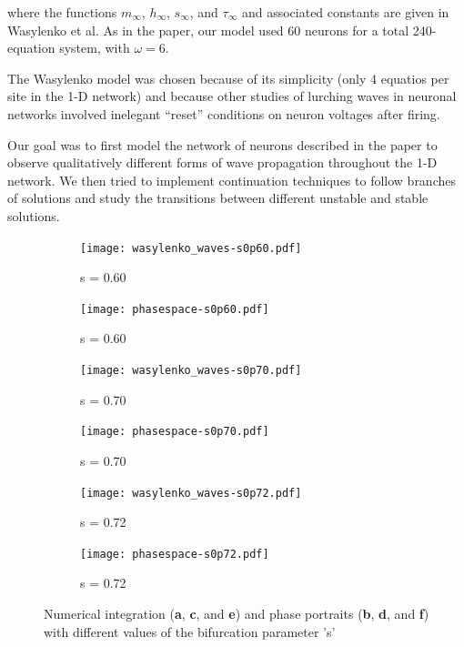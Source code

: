 \documentclass[12pt,letterpaper,oneside,openany]{article}
\begin{document}
where the functions $m_{\infty}$, $h_{\infty}$, $s_{\infty}$, and $\tau_{\infty}$ and associated constants are given in Wasylenko et al. As in the paper, our model used 60 neurons for a total 240-equation system, with $\omega=6$.\cite{Wasylenko2010}

The Wasylenko model was chosen because of its simplicity (only 4 equatios per site in the 1-D network) and because other studies of lurching waves in neuronal networks involved inelegant ``reset'' conditions on neuron voltages after firing.\cite{Golomb1999}

Our goal was to first model the network of neurons described in the paper to observe qualitatively different forms of wave propagation throughout the 1-D network. We then tried to implement continuation techniques to follow branches of solutions and study the transitions between different unstable and stable solutions.

\begin{figure}[t]
  \centering
  \begin{subfigure}[b]{0.5\textwidth}
                \centering
                \texttt{[image: wasylenko\_waves-s0p60.pdf]}
                \caption{s = 0.60}
                \label{fig:waves60}
        \end{subfigure}
        \begin{subfigure}[b]{0.4\textwidth}
                \centering
                \texttt{[image: phasespace-s0p60.pdf]}
                \caption{s = 0.60}
                \label{fig:phase60}
        \end{subfigure}

        \begin{subfigure}[b]{0.5\textwidth}
                \centering
                \texttt{[image: wasylenko\_waves-s0p70.pdf]}
                \caption{s = 0.70}
                \label{fig:waves70}
        \end{subfigure}
        \begin{subfigure}[b]{0.4\textwidth}
                \centering
                \texttt{[image: phasespace-s0p70.pdf]}
                \caption{s = 0.70}
                \label{fig:phase70}
        \end{subfigure}

        \begin{subfigure}[b]{0.5\textwidth}
                \centering
                \texttt{[image: wasylenko\_waves-s0p72.pdf]}
                \caption{s = 0.72}
                \label{fig:waves71}
        \end{subfigure}
        \begin{subfigure}[b]{0.4\textwidth}
                \centering
                \texttt{[image: phasespace-s0p72.pdf]}
                \caption{s = 0.72}
                \label{fig:phase72}
        \end{subfigure}

  \caption{Numerical integration ({\bf a}, {\bf c}, and {\bf e}) and phase portraits ({\bf b}, {\bf d}, and {\bf f}) with different values of the bifurcation parameter 's'}
  \label{fig:numint72}
\end{figure}
\end{document}
